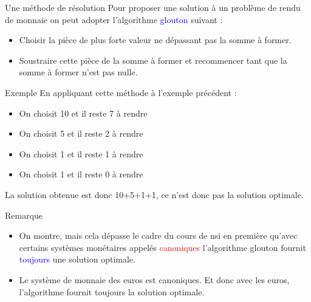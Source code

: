 \documentclass[10pt]{beamer}
\begin{document}
\begin{frame}
    \mframe{\AG}
    \begin{alertblock}{Une méthode de résolution}
        Pour proposer une solution à un problème de rendu de monnaie on peut adopter l'algorithme \textcolor{blue}{glouton} suivant :
        \begin{itemize}[label=\textbullet]
            \item<2-> Choisir la pièce de plus forte valeur ne dépassant pas la somme à former.
            \item<3-> Soustraire cette pièce de la somme à former et recommencer tant que la somme à former n'est pas nulle.
        \end{itemize}
    \end{alertblock}
\end{frame}

\begin{frame}
    \mframe{\AG}
    \begin{exampleblock}{Exemple}
        En appliquant cette méthode à l'exemple précédent :
        \begin{itemize}[label=\textbullet]
            \item<2-> On choisit 10 et il reste 7 à rendre
            \item<3-> On choisit 5 et il reste 2 à rendre
            \item<4-> On choisit 1 et il reste 1 à rendre
            \item<5-> On choisit 1 et il reste 0 à rendre
        \end{itemize}
         La solution obtenue est donc 10+5+1+1, ce n'est donc pas la solution optimale.
    \end{exampleblock}
\end{frame}

\begin{frame}
    \mframe{\AG}
    \begin{block}{Remarque}
        \begin{itemize}[label=\textbullet]
            \item<1-> On montre, mais cela dépasse le cadre du cours de {\sc nsi} en première qu'avec certains systèmes monétaires appelés \textcolor{red}{canoniques} l'algorithme glouton fournit \textcolor{blue}{toujours} une solution optimale.
            \item<2-> Le système de monnaie des euros est canoniques. Et donc avec les euros, l'algorithme fournit toujours la solution optimale.
        \end{itemize}
    \end{block}
\end{frame}
\end{document}
